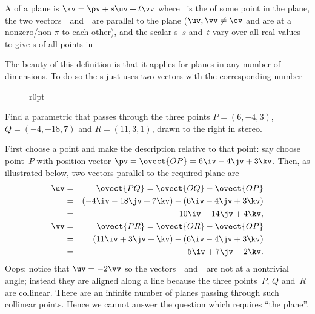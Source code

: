 \begin{definition} \label{def:parpla}
A  of a plane is \(\xv=\pv+s\uv+t\vv\) where \pv~is the  of some point in the plane,   the two vectors~\uv\ and~\vv\ are parallel to the plane (\(\uv,\vv\neq\ov\) and are at a nonzero\slash non-\(\pi\)  to each other), and the scalar s~\(s\) and~\(t\) vary over all real values to give s of all points in 
\end{definition}

The beauty of this definition is that it applies for planes in any number of dimensions.
To do so the s just uses two vectors with the corresponding number 

\begin{wrapfigure}[8]r{0pt}
 {}
\end{wrapfigure}
\begin{example} 
Find a parametric  that passes through the three points \(P=(6,-4,3)\), \(Q=(-4,-18,7)\) and \(R=(11,3,1)\), drawn to the right in stereo.

\begin{solution} 
First choose a point and make the description relative to that point: say choose point~\(P\) with position vector \(\pv=\ovect{OP}=6\iv-4\jv+3\kv\).
Then, as illustrated below, two vectors parallel to the required plane are 
\begin{eqnarray*}
\uv&=&\ovect{PQ} =\ovect{OQ}-\ovect{OP} 
\\&=&(-4\iv-18\jv+7\kv)-(6\iv-4\jv+3\kv) 
\\&=&-10\iv-14\jv+4\kv,
\\\vv&=&\ovect{PR} =\ovect{OR}-\ovect{OP} 
\\&=&(11\iv+3\jv+\kv)-(6\iv-4\jv+3\kv) 
\\&=&5\iv+7\jv-2\kv.
\end{eqnarray*}
Oops: notice that \(\uv=-2\vv\) so the vectors~\uv\ and~\vv\ are not at a nontrivial angle; instead they are aligned along a line because the three points~\(P\), \(Q\) and~\(R\) are collinear.
There are an infinite number of planes passing through such collinear  points.
Hence we cannot answer the question which requires ``the plane''.
\end{solution}
\end{example}


